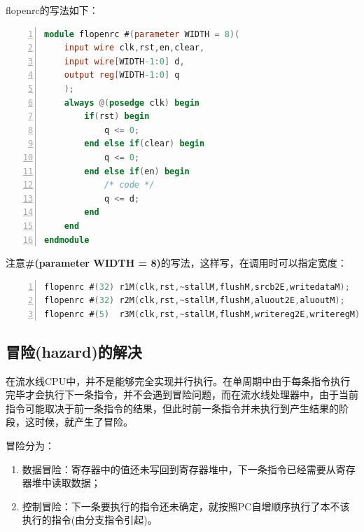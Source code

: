 flopenrc的写法如下：
\begin{lstlisting}[language=Verilog,caption=flopenrc实现,numbers=left,xleftmargin=5em,xrightmargin=5em, aboveskip=2em]
module flopenrc #(parameter WIDTH = 8)(
	input wire clk,rst,en,clear,
	input wire[WIDTH-1:0] d,
	output reg[WIDTH-1:0] q
    );
	always @(posedge clk) begin
		if(rst) begin
			q <= 0;
		end else if(clear) begin
			q <= 0;
		end else if(en) begin
			/* code */
			q <= d;
		end
	end
endmodule
\end{lstlisting}


注意\textbf{\#(parameter WIDTH = 8)}的写法，这样写，在调用时可以指定宽度：

\begin{lstlisting}[language=Verilog,caption=带参数实例化,numbers=left,xleftmargin=5em,xrightmargin=4em, aboveskip=2em]
flopenrc #(32) r1M(clk,rst,~stallM,flushM,srcb2E,writedataM);
flopenrc #(32) r2M(clk,rst,~stallM,flushM,aluout2E,aluoutM);
flopenrc #(5)  r3M(clk,rst,~stallM,flushM,writereg2E,writeregM);
\end{lstlisting}

\subsection{冒险(hazard)的解决}
在流水线CPU中，并不是能够完全实现并行执行。在单周期中由于每条指令执行完毕才会执行下一条指令，并不会遇到冒险问题，而在流水线处理器中，由于当前指令可能取决于前一条指令的结果，但此时前一条指令并未执行到产生结果的阶段，这时候，就产生了冒险。
	
冒险分为：
\begin{enumerate}
    \item 数据冒险：寄存器中的值还未写回到寄存器堆中，下一条指令已经需要从寄存器堆中读取数据；
	\item 控制冒险：下一条要执行的指令还未确定，就按照PC自增顺序执行了本不该执行的指令(由分支指令引起)。
\end{enumerate}

